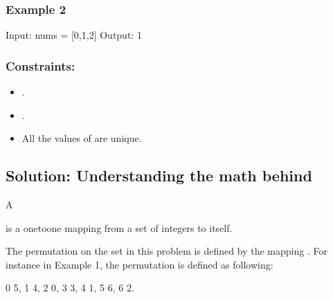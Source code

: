 \documentclass[letterpaper,12pt,english]{book}
\begin{document}
\subsubsection{Example 2}
\label{\detokenize{Mathematics/09_MTH_565_Array_Nesting:example-2}}
\begin{sphinxVerbatim}[commandchars=\\\{\}]
Input: nums = [0,1,2]
Output: 1
\end{sphinxVerbatim}


\subsubsection{Constraints:}
\label{\detokenize{Mathematics/09_MTH_565_Array_Nesting:constraints}}\begin{itemize}
\item {} 
\sphinxAtStartPar
{}.

\item {} 
\sphinxAtStartPar
{}.

\item {} 
\sphinxAtStartPar
All the values of  are unique.

\end{itemize}


\subsection{Solution: Understanding the math behind}
\label{\detokenize{Mathematics/09_MTH_565_Array_Nesting:solution-understanding-the-math-behind}}
\sphinxAtStartPar
A %
\begin{footnote}[134]\sphinxAtStartFootnote
{}
%
\end{footnote} is a one\sphinxhyphen{}to\sphinxhyphen{}one mapping from a set of integers to itself.

\sphinxAtStartPar
The permutation on the set  in this problem is defined by the mapping . For instance in Example 1, the permutation is defined as following:

\begin{sphinxVerbatim}[commandchars=\\\{\}]
0 \PYGZhy{}\PYGZgt{} 5,
1 \PYGZhy{}\PYGZgt{} 4,
2 \PYGZhy{}\PYGZgt{} 0,
3 \PYGZhy{}\PYGZgt{} 3,
4 \PYGZhy{}\PYGZgt{} 1,
5 \PYGZhy{}\PYGZgt{} 6,
6 \PYGZhy{}\PYGZgt{} 2.
\end{sphinxVerbatim}
\end{document}
